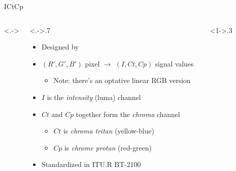 \documentclass[aspectratio=169,usepdftitle=false]{fireshonks}
\begin{document}
\begin{frame}{ICtCp}
    \begin{columns}<.->
        \begin{column}<.->{.7\textwidth}
            \begin{itemize}
                \item Designed by \textcite{ictcp}
                \item $(R', G', B')$ pixel $\rightarrow$ $(I, Ct, Cp)$ signal values
                      \begin{itemize}
                          \item Note: there's an optative linear RGB version
                      \end{itemize}
                \item $I$ is the \emph{intensity} (luma) channel
                \item $Ct$ and $Cp$ together form the \emph{chroma} channel
                      \begin{itemize}
                          \item $Ct$ is \emph{chroma tritan} (yellow-blue)
                          \item $Cp$ is \emph{chrome protan} (red-green)
                      \end{itemize}
                \item Standardized in ITU.R BT-2100 \parencite*{BT2100}
            \end{itemize}
        \end{column}
        \begin{column}<1->{.3\textwidth}
            \begin{figure}

\end{figure}
\end{column}
\end{columns}
\end{frame}
\end{document}
